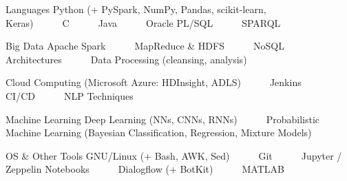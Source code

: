 

\begin{cvskills}

  \cvskill
    {Languages} %
    {Python (+ PySpark, NumPy, Pandas, scikit-learn, Keras)~~~\textbullet~~~C~~~\textbullet~~~Java~~~\textbullet~~~Oracle PL/SQL~~~\textbullet~~~SPARQL} %

  \cvskill
    {Big Data} %
    {Apache Spark~~~\textbullet~~~MapReduce \& HDFS~~~\textbullet~~~NoSQL Architectures~~~\textbullet~~~Data Processing (cleansing, analysis)~~~\textbullet~~~} %
    
\cvskill
    {} %
    {Cloud Computing (Microsoft Azure: HDInsight, ADLS)~~~\textbullet~~~Jenkins CI/CD~~~\textbullet~~~NLP Techniques} %

  \cvskill
    {Machine Learning} %
    {Deep Learning (NNs, CNNs, RNNs)~~~\textbullet~~~Probabilistic Machine Learning (Bayesian Classification, Regression, Mixture Models)} %

  \cvskill
    {OS \& Other Tools} %
    {GNU/Linux (+ Bash, AWK, Sed)~~~\textbullet~~~Git~~~\textbullet~~~Jupyter / Zeppelin Notebooks~~~\textbullet~~~Dialogflow (+ BotKit)~~~\textbullet~~~MATLAB} %

\end{cvskills}
